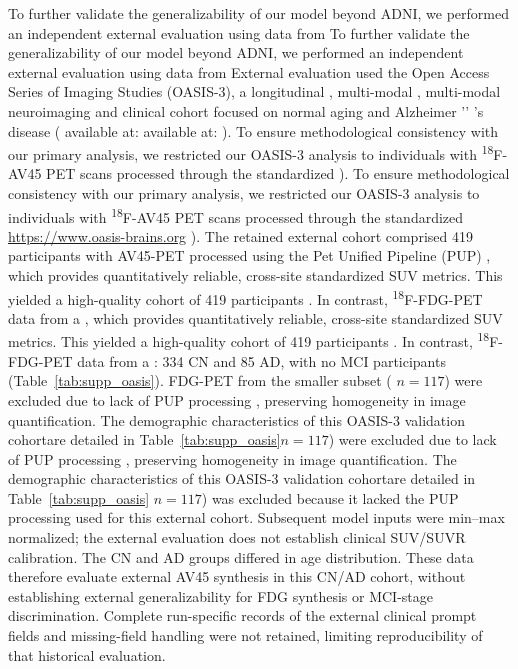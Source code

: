 \documentclass{article}
\providecommand{\DIFaddtex}[1]{{\protect\color{blue} \sf #1}} %
\providecommand{\DIFdeltex}[1]{{\protect\color{red} \ifmmode #1\else\scriptsize #1\fi}} %
\providecommand{\DIFaddbegin}{} %
\providecommand{\DIFaddend}{} %
\providecommand{\DIFdelbegin}{} %
\providecommand{\DIFdelend}{} %
\providecommand{\DIFadd}[1]{\texorpdfstring{\DIFaddtex{#1}}{#1}} %
\providecommand{\DIFdel}[1]{\texorpdfstring{\DIFdeltex{#1}}{}} %
\newcommand{\DIFscaledelfig}{0.5}
\newlength{\DIFdelgraphicswidth} %
\newlength{\DIFdelgraphicsheight} %
\newcommand{\DIFaddincludegraphics}[2][]{{\color{blue}\fbox{\DIFOincludegraphics[#1]{#2}}}} %
\newcommand{\DIFdelincludegraphics}[2][]{%
\sbox{\DIFdelgraphicsbox}{\DIFOincludegraphics[#1]{#2}}%
\settoboxwidth{\DIFdelgraphicswidth}{\DIFdelgraphicsbox} %
\settoboxtotalheight{\DIFdelgraphicsheight}{\DIFdelgraphicsbox} %
\scalebox{\DIFscaledelfig}{%
\parbox[b]{\DIFdelgraphicswidth}{\usebox{\DIFdelgraphicsbox}\\[-\baselineskip] \rule{\DIFdelgraphicswidth}{0em}}\llap{\resizebox{\DIFdelgraphicswidth}{\DIFdelgraphicsheight}{%
\setlength{\unitlength}{\DIFdelgraphicswidth}%
\begin{picture}(1,1)%
\thicklines\linethickness{2pt} %
{\color[rgb]{1,0,0}\put(0,0){\framebox(1,1){}}}%
{\color[rgb]{1,0,0}\put(0,0){\line( 1,1){1}}}%
{\color[rgb]{1,0,0}\put(0,1){\line(1,-1){1}}}%
\end{picture}%
}\hspace*{3pt}}} %
} %
\DeclareRobustCommand{\DIFaddbegin}{\DIFOaddbegin \let\includegraphics\DIFaddincludegraphics} %
\DeclareRobustCommand{\DIFaddend}{\DIFOaddend \let\includegraphics\DIFOincludegraphics} %
\DeclareRobustCommand{\DIFdelbegin}{\DIFOdelbegin \let\includegraphics\DIFdelincludegraphics} %
\DeclareRobustCommand{\DIFdelend}{\DIFOaddend \let\includegraphics\DIFOincludegraphics} %
\begin{document}
\DIFdelbegin \DIFdel{To further validate the generalizability of our model beyond ADNI, we performed an independent external evaluation using data from }\DIFdelend \DIFaddbegin \DIFadd{External evaluation used }\DIFaddend the Open Access Series of Imaging Studies (OASIS-3), a longitudinal \DIFdelbegin \DIFdel{, multi-modal }\DIFdelend neuroimaging and clinical cohort focused on normal aging and Alzheimer\DIFdelbegin \DIFdel{’}\DIFdelend \DIFaddbegin \DIFadd{'}\DIFaddend s disease (\DIFdelbegin \DIFdel{available at: }%
\DIFdel{). To ensure methodological consistency with our primary analysis, we restricted our OASIS-3 analysis to individuals with \textsuperscript{18}F-AV45 PET scans processed through the standardized }\DIFdelend \DIFaddbegin \url{https://www.oasis-brains.org}\DIFadd{). The retained external cohort comprised 419 participants with AV45-PET processed using the }\DIFaddend Pet Unified Pipeline (PUP)\DIFdelbegin \DIFdel{, which provides quantitatively reliable, cross-site standardized SUV metrics. This yielded a high-quality cohort of 419 participants . In contrast, \textsuperscript{18}F-FDG-PET data from a }\DIFdelend \DIFaddbegin \DIFadd{: 334 CN and 85 AD, with no MCI participants (Table~\ref{tab:supp_oasis}). FDG-PET from the }\DIFaddend smaller subset (\DIFdelbegin \DIFdel{$n = 117$) were excluded due to lack of PUP processing , preserving homogeneity in image quantification. The demographic characteristics of this OASIS-3 validation cohortare detailed in Table~\ref{tab:supp_oasis}}\DIFdelend \DIFaddbegin \DIFadd{$n=117$) was excluded because it lacked the PUP processing used for this external cohort. Subsequent model inputs were min--max normalized; the external evaluation does not establish clinical SUV/SUVR calibration. The CN and AD groups differed in age distribution. These data therefore evaluate external AV45 synthesis in this CN/AD cohort, without establishing external generalizability for FDG synthesis or MCI-stage discrimination. Complete run-specific records of the external clinical prompt fields and missing-field handling were not retained, limiting reproducibility of that historical evaluation}\DIFaddend .
\end{document}
